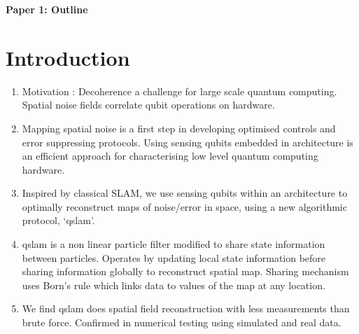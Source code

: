 {\large \textbf{Paper 1: Outline }} 
\section{Introduction}
\begin{enumerate}
\item Motivation : Decoherence a challenge for large scale quantum computing. Spatial noise fields correlate qubit operations on hardware. 
\item Mapping spatial noise is a first step in developing optimised controls and error suppressing protocols. Using sensing qubits embedded in architecture is an efficient approach for characterising low level quantum computing hardware. 
\item Inspired by classical SLAM, we use sensing qubits within an architecture to optimally reconstruct maps of noise/error in space, using a new algorithmic protocol, `qslam'. 
\item qslam is a non linear particle filter modified to share state information between particles. Operates by updating local state information before sharing information globally to  reconstruct spatial  map. Sharing mechanism uses Born's rule which links data to values of the map at any location.
\item We find qslam does spatial field reconstruction with less measurements than brute force. Confirmed in numerical testing using simulated and real data.  
\end{enumerate} 
